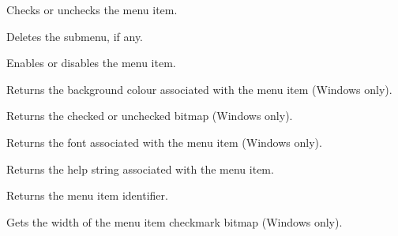 
Checks or unchecks the menu item.

\label{wxmenuitemdeletesubmenu}


Deletes the submenu, if any.

\label{wxmenuitemenable}


Enables or disables the menu item.

\label{wxmenuitemgetbackgroundcolour}


Returns the background colour associated with the menu item (Windows only).

\label{wxmenuitemgetbitmap}


Returns the checked or unchecked bitmap (Windows only).

\label{wxmenuitemgetfont}


Returns the font associated with the menu item (Windows only).

\label{wxmenuitemgethelp}


Returns the help string associated with the menu item.

\label{wxmenuitemgetid}


Returns the menu item identifier.

\label{wxmenuitemgetmarginwidth}


Gets the width of the menu item checkmark bitmap (Windows only).

\label{wxmenuitemgetname}


